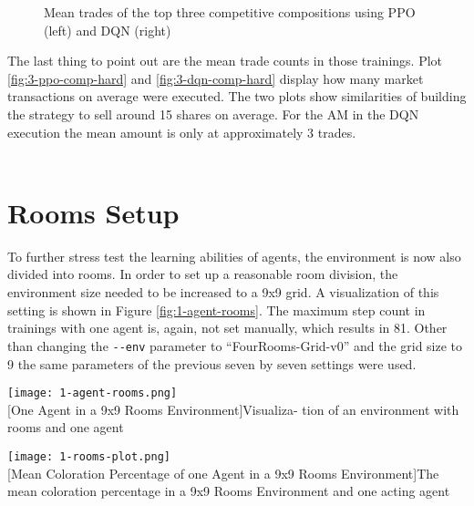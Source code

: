 \begin{figure}[hpbt]
    \centering
    \hspace{0.01\textwidth}
    \caption[Mean Trades of the Top Competitive Modes in a 7x7 Environment]{Mean trades of the top three competitive compositions using PPO (left) and DQN (right)}
    \label{fig:multipic_plots_comp_hard} 
\end{figure}

The last thing to point out are the mean trade counts in those trainings. Plot \ref{fig:3-ppo-comp-hard} and \ref{fig:3-dqn-comp-hard} display how many market transactions on average were executed. The two plots show similarities of building the strategy to sell around 15 shares on average. For the AM in the DQN execution the mean amount is only at approximately 3 trades. \\\\

\section{Rooms Setup}\label{room_env}
To further stress test the learning abilities of agents, the environment is now also divided into rooms. In order to set up a reasonable room division, the environment size needed to be increased to a 9x9 grid. A visualization of this setting is shown in Figure \ref{fig:1-agent-rooms}. The maximum step count in trainings with one agent is, again, not set manually, which results in 81. Other than changing the \verb|--env| parameter to ``FourRooms-Grid-v0'' and the grid size to 9 the same parameters of the previous seven by seven settings were used. \\

\begin{minipage}{\textwidth}
  \begin{minipage}[b]{0.29\textwidth}
    \centering
    \texttt{[image: 1-agent-rooms.png]}\\
    [One Agent in a 9x9 Rooms Environment]{Visualiza- tion of an environment with rooms and one agent}\label{fig:1-agent-rooms}
  \end{minipage}
  \hfill
  \begin{minipage}[b]{0.69\textwidth}
    \centering
    \texttt{[image: 1-rooms-plot.png]}\\
    [Mean Coloration Percentage of one Agent in a 9x9 Rooms Environment]{The mean coloration percentage in a 9x9 Rooms Environment and one acting agent \\}\label{fig:1-rooms-plot}
    \end{minipage}
  \end{minipage}\\\\

